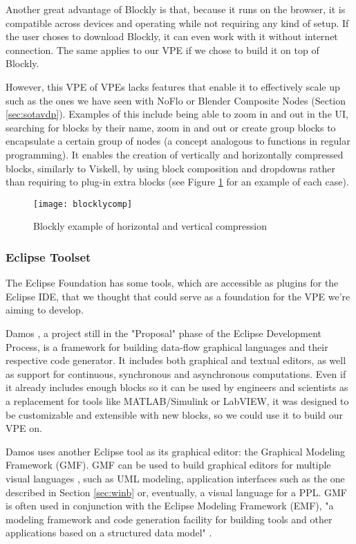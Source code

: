 Another great advantage of Blockly is that, because it runs on the browser, it is
compatible across devices and operating while not requiring any kind of setup.
If the user choses to download Blockly, it can even work with it without internet
connection. The same applies to our VPE if we chose to build it on top of Blockly.

However, this VPE of VPEs lacks features that enable it to effectively scale up
such as the ones we have seen with NoFlo or Blender Composite Nodes (Section \ref{sec:sotavdp}).
Examples of this include being able to zoom in and out in the UI, searching for
blocks by their name, zoom in and out or create group blocks to encapsulate a certain group of
nodes (a concept analogous to functions in regular programming). It enables the
creation of vertically and horizontally compressed blocks, similarly to Viskell,
by using block composition and dropdowns rather than requiring to plug-in extra blocks
(see Figure \ref{fig:blocklycomp} for an example of each case).

\begin{figure}[t]
  \begin{center}
    \leavevmode
    \texttt{[image: blocklycomp]}
    \caption{Blockly example of horizontal and vertical compression \cite{blockly}}
    \label{fig:blocklycomp}
  \end{center}
\end{figure}

\subsubsection{Eclipse Toolset}

The Eclipse Foundation has some tools, which are accessible as plugins for the
Eclipse IDE, that we thought that could serve as a foundation for the VPE we're
aiming to develop.

Damos \cite{damos}, a project still in the "Proposal" phase of the Eclipse
Development Process, is a framework for building data-flow graphical languages
and their respective code generator. It includes both graphical and textual editors,
as well as support for continuous, synchronous and asynchronous computations.
Even if it already includes enough blocks so it can be used by engineers and scientists
as a replacement for tools like MATLAB/Simulink or LabVIEW, it was designed to
be customizable and extensible with new blocks, so we could use it to build our VPE on.

Damos uses another Eclipse tool as its graphical editor: the Graphical Modeling
Framework (GMF). GMF can be used to build graphical editors for multiple visual
languages \cite{gmf}, such as UML modeling, application interfaces such as the
one described in Section \ref{sec:winb} or, eventually, a visual language for a
PPL. GMF is often used in conjunction with the Eclipse Modeling Framework (EMF),
"a modeling framework and code generation facility for building tools and other
applications based on a structured data model" \cite{emf}.

